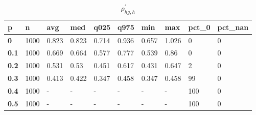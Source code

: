 \begin{table}[h]
 \centering 
\footnotesize
\caption{$\rho_{hg,h}^\prime $}
\label{tab:alphahgh}
\begin{tabular}[h]{|l|l|l|l|l|l|l|l|l|l|
    } \hline
\textbf{ p} & \textbf{ n} & \textbf{ avg} & \textbf{ med} & \textbf{ q025} & \textbf{ q975} & \textbf{ min} & \textbf{ max} & \textbf{ pct\_0} & \textbf{ pct\_nan}
    \\ \hline
  \textbf{  0} & 1000 & 0.823 & 0.823 & 0.714 & 0.936 & 0.657 & 1.026 &   0 & 0
    \\ \hline
  \textbf{0.1} & 1000 & 0.669 & 0.664 & 0.577 & 0.777 & 0.539 &  0.86 &   0 & 0
    \\ \hline
  \textbf{0.2} & 1000 & 0.531 &  0.53 & 0.451 & 0.617 & 0.431 & 0.647 &   2 & 0
    \\ \hline
  \textbf{0.3} & 1000 & 0.413 & 0.422 & 0.347 & 0.458 & 0.347 & 0.458 &  99 & 0
    \\ \hline
  \textbf{0.4} & 1000 & - & - & - & - & - & - & 100 & 0
    \\ \hline
  \textbf{0.5} & 1000 & - & - & - & - & - & - & 100 & 0
    \\ \hline
 \end{tabular}
 \end{table}
